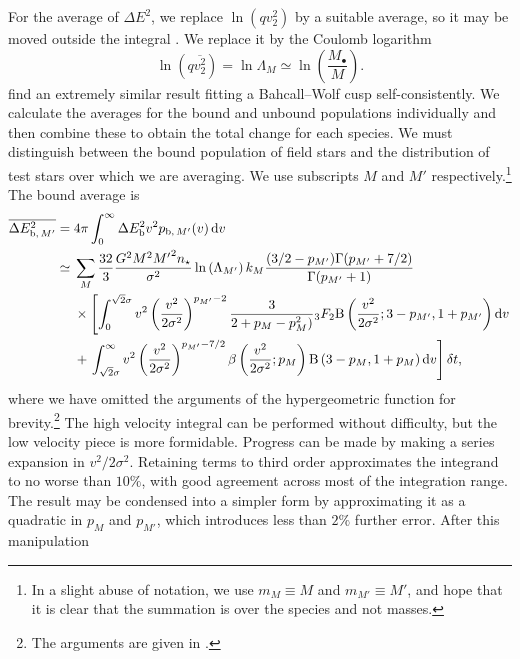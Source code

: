For the average of $\Delta E^2$, we replace $\ln\left(qv_2^2\right)$ by a suitable average, so it may be moved outside the integral \citep[chapter 2]{Chandrasekhar1960}. We replace it by the Coulomb logarithm \citep{Bahcall1976}
\begin{equation}
\ln\left(q\overline{v_2^2}\right) = \ln \Lambda_M \simeq \ln\left(\dfrac{M_\bullet}{M}\right).
\end{equation}
\citet{Just2011} find an extremely similar result fitting a Bahcall--Wolf cusp self-consistently. We calculate the averages for the bound and unbound populations individually and then combine these to obtain the total change for each species. We must distinguish between the bound population of field stars and the distribution of test stars over which we are averaging. We use subscripts $M$ and $M'$ respectively.\footnote{In a slight abuse of notation, we use $m_M \equiv M$ and $m_{M'} \equiv M'$, and hope that it is clear that the summation is over the species and not masses.} The bound average is
\begin{align}
\overline{\Delta E^2_{\mathrm{b},\,M'}} = {} & 4\pi\intd{0}{\infty}{\Delta E^2\sub{b} v^2 p_{\mathrm{b},\,M'}(v)}{v} \\
 \simeq {} & \sum_M\dfrac{32}{3}\dfrac{G^2M^2{M'}^2n_\star}{\sigma^2}\ln\left(\Lambda_{M'}\right) k_M \dfrac{(3/2 - p_{M'})\Gamma(p_{M'} + 7/2)}{\Gamma(p_{M'} + 1)} \nonumber \\* 
 {} & \times \left[ \intd{0}{\sqrt{2}\sigma}{v^2\left(\dfrac{v^2}{2\sigma^2}\right)^{p_{M'}-2} \dfrac{3}{2 + p_M - p_M^2)} {_3F_2}%
 \Beta\left(\dfrac{v^2}{2\sigma^2};3-p_{M'},1+p_{M'}\right)}{v} \right. \nonumber \\* 
 {} & + \left. \intd{\sqrt{2}\sigma}{\infty}{v^2\left(\dfrac{v^2}{2\sigma^2}\right)^{p_{M'}-7/2} \beta\left(\dfrac{v^2}{2\sigma^2};p_M\right) \Beta\left(3-p_M,1+p_M\right)}{v} \right] \delta t,
\end{align}
where we have omitted the arguments of the hypergeometric function for brevity.\footnote{The arguments are given in .} The high velocity integral can be performed without difficulty, but the low velocity piece is more formidable. Progress can be made by making a series expansion in $v^2/2\sigma^2$. Retaining terms to third order approximates the integrand to no worse than $10\%$, with good agreement across most of the integration range. The result may be condensed into a simpler form by approximating it as a quadratic in $p_M$ and $p_{M'}$, which introduces less than $2\%$ further error. After this manipulation
